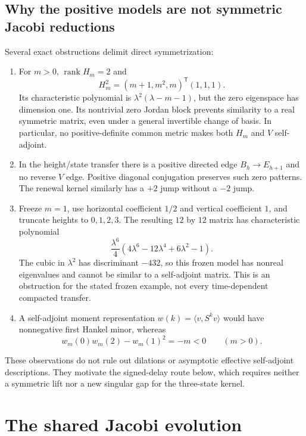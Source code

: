 \documentclass[11pt,letterpaper]{article}
\numberwithin{equation}{section}
\theoremstyle{remark}
\begin{document}
\subsection{Why the positive models are not symmetric Jacobi reductions}
Several exact obstructions delimit direct symmetrization:
\begin{enumerate}
\item For $m>0$, $\operatorname{rank}H_m=2$ and
\[
H_m^2=(m+1,m^2,m)^{\mathsf T}(1,1,1).
\]
Its characteristic polynomial is $\lambda^2(\lambda-m-1)$, but the zero
eigenspace has dimension one. Its nontrivial zero Jordan block prevents
similarity to a real symmetric matrix, even under a general invertible
change of basis. In particular, no positive-definite common metric makes
both $H_m$ and $V$ self-adjoint.
\item In the height/state transfer there is a positive directed edge
$B_h\to E_{h+1}$ and no reverse $V$ edge. Positive diagonal conjugation
preserves such zero patterns. The renewal kernel similarly has a $+2$ jump
without a $-2$ jump.
\item Freeze $m=1$, use horizontal coefficient $1/2$ and vertical coefficient
$1$, and truncate heights to $0,1,2,3$. The resulting $12$ by $12$ matrix has
characteristic polynomial
\[
\frac{\lambda^6}{4}(4\lambda^6-12\lambda^4+6\lambda^2-1).
\]
The cubic in $\lambda^2$ has discriminant $-432$, so this frozen model has
nonreal eigenvalues and cannot be similar to a self-adjoint matrix. This is
an obstruction for the stated frozen example, not every time-dependent
compacted transfer.
\item A self-adjoint moment representation $w(k)=\langle v,S^kv\rangle$
would have nonnegative first Hankel minor, whereas
\[
w_m(0)w_m(2)-w_m(1)^2=-m<0\qquad(m>0).
\]
\end{enumerate}
These observations do not rule out dilations or asymptotic effective
self-adjoint descriptions. They motivate the signed-delay route below,
which requires neither a symmetric lift nor a new singular gap for the
three-state kernel.

\section{The shared Jacobi evolution}\label{air:cb:sec:jacobi}
\end{document}
